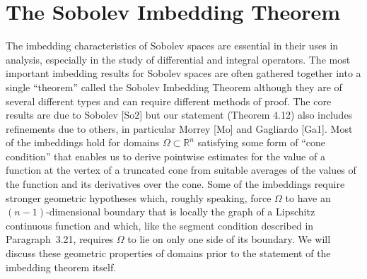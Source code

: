\chapter{The Sobolev Imbedding Theorem}


\begin{para}
  The imbedding characteristics of Sobolev spaces are essential in their uses in analysis, 
  especially in the study of differential and integral operators.
  The most important imbedding results for Sobolev spaces are often gathered together into
  a single ``theorem'' called the Sobolev Imbedding Theorem although they are of several different
  types and can require different methods of proof.
  The core results are due to Sobolev [So2] but our statement (Theorem 4.12) 
  also includes refinements due to others, in particular Morrey [Mo] and Gagliardo [Ga1].
  Most of the imbeddings hold for domains $\Omega \subset \mathbb{R}^n$ satisfying some form of 
  ``cone condition'' that enables us to derive pointwise estimates for the value of a function at 
  the vertex of a truncated cone from suitable averages of the values of the function and its 
  derivatives over the cone. Some of the imbeddings require stronger geometric hypotheses which, 
  roughly speaking, force $\Omega$ to have an $(n-1)$-dimensional boundary that is locally the 
  graph of a Lipschitz continuous function and which, like the segment condition described in 
  Paragraph~3.21, requires $\Omega$ to lie on only one side of its boundary. We will discuss these 
  geometric properties of domains prior to the statement of the imbedding theorem itself.
\end{para}


